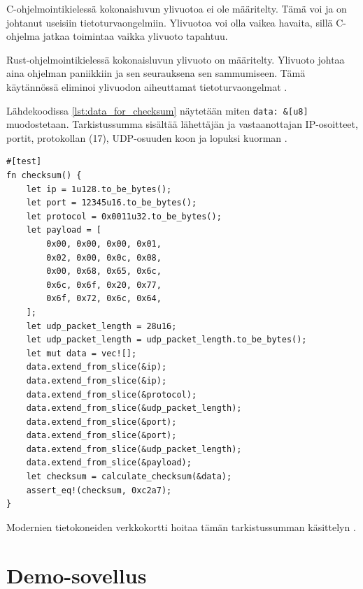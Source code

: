 \documentclass[a4paper,12pt]{article}
\begin{document}
    \begin{framed}
        C-ohjelmointikielessä kokonaisluvun ylivuotoa ei ole määritelty. Tämä voi ja on johtanut useisiin tietoturvaongelmiin. Ylivuotoa voi olla vaikea havaita, sillä C-ohjelma jatkaa toimintaa vaikka ylivuoto tapahtuu.\par
    Rust-ohjelmointikielessä kokonaisluvun ylivuoto on määritelty. Ylivuoto johtaa aina ohjelman paniikkiin\footnotemark{} ja sen seurauksena sen sammumiseen. Tämä käytännössä eliminoi ylivuodon aiheuttamat tietoturvaongelmat \cite[luku 3.2]{rust-book}.
    \end{framed}
    \begin{minipage}{\linewidth}

    Lähdekoodissa \ref{lst:data_for_checksum} näytetään miten \lstinline{data: &[u8]} muodostetaan. Tarkistussumma sisältää lähettäjän ja vastaanottajan IP-osoitteet, portit, protokollan (17), UDP-osuuden koon ja lopuksi kuorman \cite{RFC-768, protocol-numbers}. \par

        \begin{lstlisting}[caption={Tietojen kasaaminen tarkistussummaa varten}, label={lst:data_for_checksum}]
#[test]
fn checksum() {
    let ip = 1u128.to_be_bytes();
    let port = 12345u16.to_be_bytes();
    let protocol = 0x0011u32.to_be_bytes();
    let payload = [
        0x00, 0x00, 0x00, 0x01,
        0x02, 0x00, 0x0c, 0x08,
        0x00, 0x68, 0x65, 0x6c,
        0x6c, 0x6f, 0x20, 0x77,
        0x6f, 0x72, 0x6c, 0x64,
    ];
    let udp_packet_length = 28u16;
    let udp_packet_length = udp_packet_length.to_be_bytes();
    let mut data = vec![];
    data.extend_from_slice(&ip);
    data.extend_from_slice(&ip);
    data.extend_from_slice(&protocol);
    data.extend_from_slice(&udp_packet_length);
    data.extend_from_slice(&port);
    data.extend_from_slice(&port);
    data.extend_from_slice(&udp_packet_length);
    data.extend_from_slice(&payload);
    let checksum = calculate_checksum(&data);
    assert_eq!(checksum, 0xc2a7);
}
        \end{lstlisting}
    \end{minipage}

    Modernien tietokoneiden verkkokortti hoitaa tämän tarkistussumman käsittelyn \cite{VivianoTCP/IPLearn}.


    \section{Demo-sovellus}\label{sec:demo}
\end{document}
